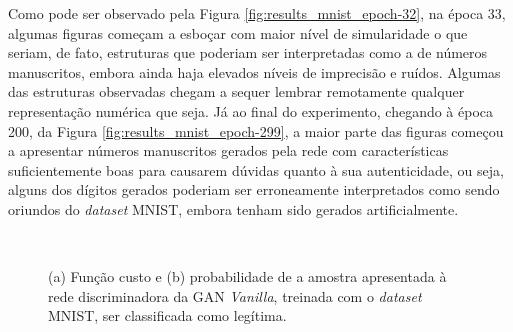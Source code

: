 Como pode ser observado pela Figura \ref{fig:results_mnist_epoch-32}, na época 33, algumas figuras começam a esboçar com maior nível de simularidade o que seriam, de fato, estruturas que poderiam ser interpretadas como a de números manuscritos, embora ainda haja elevados níveis de imprecisão e ruídos. Algumas das estruturas observadas chegam a sequer lembrar remotamente qualquer representação numérica que seja. Já ao final do experimento, chegando à época 200, da Figura \ref{fig:results_mnist_epoch-299}, a maior parte das figuras começou a apresentar números manuscritos gerados pela rede com características suficientemente boas para causarem dúvidas quanto à sua autenticidade, ou seja, alguns dos dígitos gerados poderiam ser erroneamente interpretados como sendo oriundos do \textit{dataset} MNIST, embora tenham sido gerados artificialmente.


\begin{figure}[H]
    \centering
    \\
    \vspace{0.5cm}
    \caption{(a) Função custo e (b) probabilidade de a amostra apresentada à rede discriminadora da GAN \textit{Vanilla}, treinada com o \textit{dataset} MNIST, ser classificada como legítima.}
    \label{fig:results_pytorch_vanilla_mnist_scores}
\end{figure}


